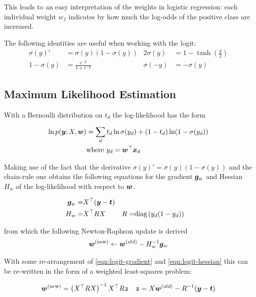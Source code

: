 This leads to an easy interpretation of the weights in logistic regression: each individual weight $w_f$ indicates by how much the log-odds of the positive class are increased.

The following identities are useful when working with the logit:
\begin{align}
\sigma(y)' & = \sigma(y)(1 - \sigma(y)) \label{eqn:sigma-identity} &
2 \sigma(y) & = 1 - \tanh (\frac{y}{2}) \\
1 - \sigma(y) & = \frac{e^{-y}}{1 + e^{-y}} &
\sigma(-y) & = -\sigma(y)
\end{align}


\subsection*{Maximum Likelihood Estimation}
With a Bernoulli distribution on $t_d$ the log-likelihood has the form

\begin{equation}
\begin{aligned}
\ln p(\bm y; X, \bm w) & = \sum_d t_d \ln \sigma(y_d) + (1 - t_d) \ln (1 - \sigma(y_d)) \\
& \text{where } y_d = \bm w^\top\bm x_d
\end{aligned}
\end{equation}

Making use of the fact that the derivative $\sigma(y)' = \sigma(y)(1 - \sigma(y))$ and the chain-rule one obtains the following equations for the gradient $\bm g_w$ and Hessian $H_w$ of the log-likelihood with respect to $\bm w$.

\begin{align}
\bm g_w = & X^\top (\bm y - \bm t) \label{eqn:logit-gradient}\\
H_w      = & X^\top R X & R = & \text{diag} \left( {y_d (1 - y_d)} \right) \label{eqn:logit-hessian}
\end{align}

from which the following Newton-Raphson update is derived
\begin{align}
\bm w^{(\text{new})} \leftarrow \bm w^{(old)} - H_w^{-1} \bm g_w
\end{align}

With some re-arrangement of \eqref{eqn:logit-gradient} and \eqref{eqn:logit-hessian} this can be re-written in the form of a weighted least-squares problem:

\begin{align}
\bm w^{(\text{new})} & = \left(X^\top R X \right)^{-1} X^\top R \bm z & \bm z = X \bm w^{(old)}-R^{-1}(\bm y - \bm t)
\end{align}


